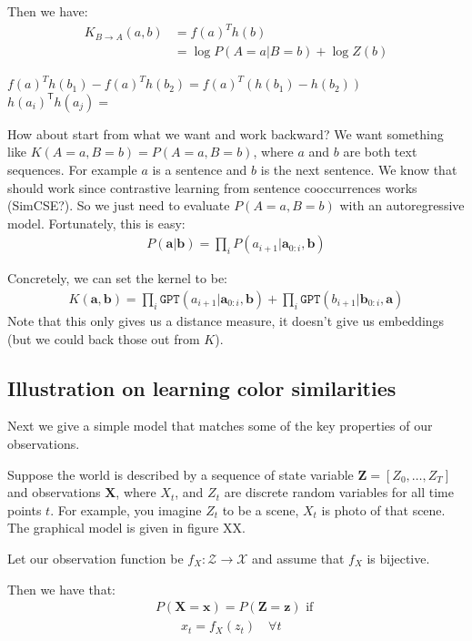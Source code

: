 \documentclass{article}
\theoremstyle{plain}
\theoremstyle{definition}
\theoremstyle{remark}
\newcommand{\transpose}{\mathsf{T}}
\begin{document}
Then we have:
\begin{align}
    K_{B \rightarrow A}(a, b) &= f(a)^T h(b)\\
    &= \log P(A = a | B = b) + \log Z(b)
\end{align}

$f(a)^T h(b_1) - f(a)^T h(b_2) = f(a)^T (h(b_1) - h(b_2))$
$h(a_i)^\transpose h(a_j) = $ 


How about start from what we want and work backward? We want something like $K(A=a,B=b) = P(A=a,B=b)$, where $a$ and $b$ are both text sequences. For example $a$ is a sentence and $b$ is the next sentence. We know that should work since contrastive learning from sentence cooccurrences works (SimCSE?). So we just need to evaluate $P(A=a,B=b)$ with an autoregressive model. Fortunately, this is easy:
\begin{align}
    P(\mathbf{a} | \mathbf{b}) = \prod_i P(a_{i+1} | \mathbf{a}_{0:i}, \mathbf{b})
\end{align}

Concretely, we can set the kernel to be:
\begin{align}
    K(\mathbf{a}, \mathbf{b}) = \prod_i \texttt{GPT}(a_{i+1} | \mathbf{a}_{0:i}, \mathbf{b}) + \prod_i \texttt{GPT}(b_{i+1} | \mathbf{b}_{0:i}, \mathbf{a})
\end{align}
Note that this only gives us a distance measure, it doesn't give us embeddings (but we could back those out from $K$).

\subsection{Illustration on learning color similarities}


Next we give a simple model that matches some of the key properties of our observations.

Suppose the world is described by a sequence of state variable $\mathbf{Z} = [Z_0, \ldots, Z_T]$ and observations $\mathbf{X}$, where $X_t$, and $Z_t$ are discrete random variables for all time points $t$. For example, you imagine $Z_t$ to be a scene, $X_t$ is photo of that scene. The graphical model is given in figure XX.

Let our observation function be $f_X: \mathcal{Z} \rightarrow \mathcal{X}$ and assume that $f_X$ is bijective.

Then we have that:
\begin{align}
    P(\mathbf{X} = \mathbf{x}) = P(\mathbf{Z} = \mathbf{z}) \text{ if } \nonumber \\
    \quad\quad x_t = f_X(z_t) \quad\forall t
\end{align}
\end{document}
